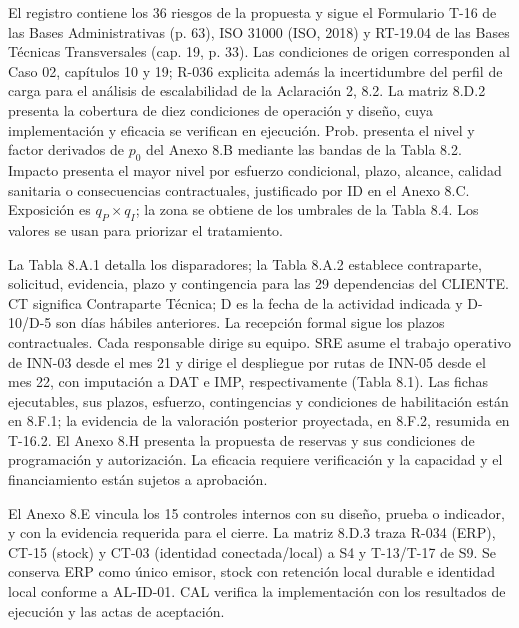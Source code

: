 \documentclass[carta,firma,sinnotas]{lafrox}
\begin{document}
\portadalafrox
\preliminareslafrox
\setcounter{chapter}{7}

El registro contiene los 36 riesgos de la propuesta y sigue el Formulario T-16 de las Bases Administrativas (p. 63), ISO 31000 (ISO, 2018) y RT-19.04 de las Bases Técnicas Transversales (cap. 19, p. 33). Las condiciones de origen corresponden al Caso 02, capítulos 10 y 19; R-036 explicita además la incertidumbre del perfil de carga para el análisis de escalabilidad de la Aclaración 2, 8.2. La matriz 8.D.2 presenta la cobertura de diez condiciones de operación y diseño, cuya implementación y eficacia se verifican en ejecución. Prob. presenta el nivel y factor derivados de $p_0$ del Anexo 8.B mediante las bandas de la Tabla 8.2. Impacto presenta el mayor nivel por esfuerzo condicional, plazo, alcance, calidad sanitaria o consecuencias contractuales, justificado por ID en el Anexo 8.C. Exposición es $q_P\times q_I$; la zona se obtiene de los umbrales de la Tabla 8.4. Los valores se usan para priorizar el tratamiento.

La Tabla 8.A.1 detalla los disparadores; la Tabla 8.A.2 establece contraparte, solicitud, evidencia, plazo y contingencia para las 29 dependencias del CLIENTE. CT significa Contraparte Técnica; D es la fecha de la actividad indicada y D-10/D-5 son días hábiles anteriores. La recepción formal sigue los plazos contractuales. Cada responsable dirige su equipo. SRE asume el trabajo operativo de INN-03 desde el mes 21 y dirige el despliegue por rutas de INN-05 desde el mes 22, con imputación a DAT e IMP, respectivamente (Tabla 8.1). Las fichas ejecutables, sus plazos, esfuerzo, contingencias y condiciones de habilitación están en 8.F.1; la evidencia de la valoración posterior proyectada, en 8.F.2, resumida en T-16.2. El Anexo 8.H presenta la propuesta de reservas y sus condiciones de programación y autorización. La eficacia requiere verificación y la capacidad y el financiamiento están sujetos a aprobación.

El Anexo 8.E vincula los 15 controles internos con su diseño, prueba o indicador, y con la evidencia requerida para el cierre. La matriz 8.D.3 traza R-034 (ERP), CT-15 (stock) y CT-03 (identidad conectada/local) a S4 y T-13/T-17 de S9. Se conserva ERP como único emisor, stock con retención local durable e identidad local conforme a AL-ID-01. CAL verifica la implementación con los resultados de ejecución y las actas de aceptación.
\end{document}
